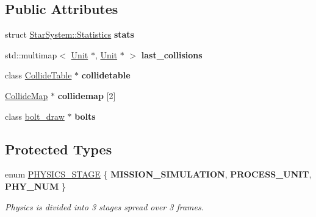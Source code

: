\subsection*{Public Attributes}
\begin{DoxyCompactItemize}
\item 
struct \hyperlink{structStarSystem_1_1Statistics}{Star\+System\+::\+Statistics} {\bfseries stats}\hypertarget{classStarSystem_a8c4be01bdf57cb5129cd0a9be7618904}{}\label{classStarSystem_a8c4be01bdf57cb5129cd0a9be7618904}

\item 
std\+::multimap$<$ \hyperlink{classUnit}{Unit} $\ast$, \hyperlink{classUnit}{Unit} $\ast$ $>$ {\bfseries last\+\_\+collisions}\hypertarget{classStarSystem_a0851d3f8cca7968957b965607c779785}{}\label{classStarSystem_a0851d3f8cca7968957b965607c779785}

\item 
class \hyperlink{classCollideTable}{Collide\+Table} $\ast$ {\bfseries collidetable}\hypertarget{classStarSystem_a330113d8efeff095d4a3eea670d14827}{}\label{classStarSystem_a330113d8efeff095d4a3eea670d14827}

\item 
\hyperlink{classCollideMap}{Collide\+Map} $\ast$ {\bfseries collidemap} \mbox{[}2\mbox{]}\hypertarget{classStarSystem_ac06460018fba8de6bc46490ad2d55d6b}{}\label{classStarSystem_ac06460018fba8de6bc46490ad2d55d6b}

\item 
class \hyperlink{classbolt__draw}{bolt\+\_\+draw} $\ast$ {\bfseries bolts}\hypertarget{classStarSystem_a1e9f525ed1b5ab0e0ba128679155b542}{}\label{classStarSystem_a1e9f525ed1b5ab0e0ba128679155b542}

\end{DoxyCompactItemize}
\subsection*{Protected Types}
\begin{DoxyCompactItemize}
\item 
enum \hyperlink{classStarSystem_ae8d7d6862b3d9218cb82894352895aa7}{P\+H\+Y\+S\+I\+C\+S\+\_\+\+S\+T\+A\+GE} \{ {\bfseries M\+I\+S\+S\+I\+O\+N\+\_\+\+S\+I\+M\+U\+L\+A\+T\+I\+ON}, 
{\bfseries P\+R\+O\+C\+E\+S\+S\+\_\+\+U\+N\+IT}, 
{\bfseries P\+H\+Y\+\_\+\+N\+UM}
 \}\hypertarget{classStarSystem_ae8d7d6862b3d9218cb82894352895aa7}{}\label{classStarSystem_ae8d7d6862b3d9218cb82894352895aa7}
\begin{DoxyCompactList}\small\item\em Physics is divided into 3 stages spread over 3 frames. \end{DoxyCompactList}
\end{DoxyCompactItemize}
